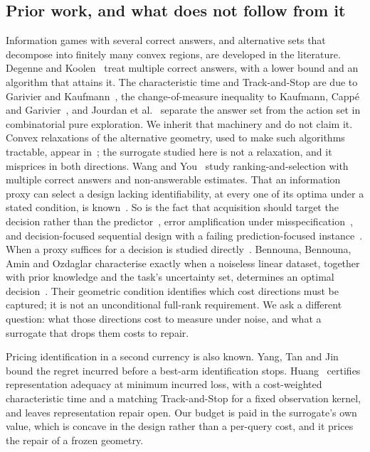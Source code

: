 \subsection{Prior work, and what does not follow from it}

Information games with several correct answers, and alternative sets that decompose into
finitely many convex regions, are developed in the literature. Degenne and
Koolen~\cite{degenne2019} treat multiple correct answers, with a lower bound and an algorithm
that attains it. The characteristic time and Track-and-Stop are due to Garivier and
Kaufmann~\cite{garivier2016}, the change-of-measure inequality to Kaufmann, Capp\'e and
Garivier~\cite{kaufmann2016}, and Jourdan et al.~\cite{jourdan2021} separate the answer set from
the action set in combinatorial pure exploration. We inherit that machinery and do not claim
it. Convex relaxations of the alternative geometry, used to make such algorithms tractable,
appear in~\cite{shukla2024}; the surrogate studied here is not a relaxation, and it misprices in
both directions. Wang and You~\cite{wangyou2026} study ranking-and-selection with multiple
correct answers and non-answerable estimates. That an information proxy can select a design
lacking identifiability, at every one of its optima under a stated condition, is
known~\cite{overstall2022}. So is the fact that acquisition should target the decision rather
than the predictor~\cite{filstroff2021}, error amplification under
misspecification~\cite{tang2026}, and decision-focused sequential design with a failing
prediction-focused instance~\cite{wan2026}. When a proxy suffices for a decision is studied
directly~\cite{schutte2026}. Bennouna, Bennouna, Amin and Ozdaglar characterise exactly when a
noiseless linear dataset, together with prior knowledge and the task's uncertainty set,
determines an optimal decision~\cite{bennouna2025,bennouna2026}. Their geometric condition
identifies which cost directions must be captured; it is not an unconditional full-rank
requirement. We ask a different question: what those directions cost to
measure under noise, and what a surrogate that drops them costs to repair.

Pricing identification in a second currency is also known. Yang, Tan and Jin~\cite{yang2024}
bound the regret incurred before a best-arm identification stops. Huang~\cite{huang2026}
certifies representation adequacy at minimum incurred loss, with a cost-weighted
characteristic time and a matching Track-and-Stop for a fixed observation kernel, and leaves
representation repair open. Our budget is paid in the surrogate's own value, which is concave
in the design rather than a per-query cost, and it prices the repair of a frozen geometry.


